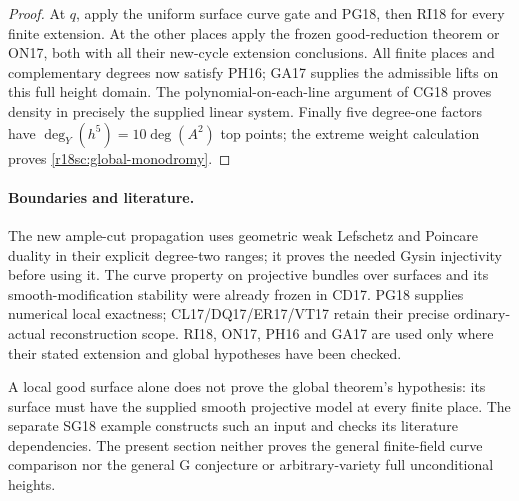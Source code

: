 \begin{proof}
At $q$, apply the uniform surface
curve gate and PG18, then RI18
for every finite extension.
At the other places apply the
frozen good-reduction theorem
or ON17, both with all their
new-cycle extension conclusions.
All finite places and complementary
degrees now satisfy PH16; GA17
supplies the admissible lifts on
this full height domain.
The polynomial-on-each-line
argument of CG18 proves density
in precisely the supplied linear
system.  Finally five degree-one
factors have $\deg_Y(h^5)=10\deg(A^2)$
top points; the extreme weight
calculation proves
\eqref{r18sc:global-monodromy}.
\end{proof}

\paragraph{Boundaries and literature.}
The new ample-cut propagation uses geometric
weak Lefschetz and Poincare duality in their
explicit degree-two ranges; it proves the
needed Gysin injectivity before using it.
The curve property on projective bundles
over surfaces and its smooth-modification
stability were already frozen in CD17.
PG18 supplies numerical local exactness;
CL17/DQ17/ER17/VT17 retain their precise
ordinary-actual reconstruction scope.
RI18, ON17, PH16 and GA17 are used only
where their stated extension and global
hypotheses have been checked.

A local good surface alone does not prove
the global theorem's hypothesis: its
surface must have the supplied smooth
projective model at every finite place.
The separate SG18 example constructs
such an input and checks its literature
dependencies.  The present section
neither proves the general finite-field
curve comparison nor the general G
conjecture or arbitrary-variety full
unconditional heights.
